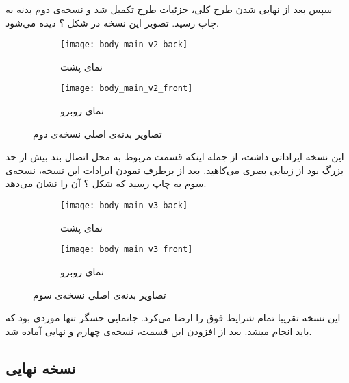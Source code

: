 سپس بعد از نهایی شدن طرح کلی، جزئیات طرح تکمیل شد و نسخه‌ی دوم بدنه به چاپ رسید. تصویر این نسخه در شکل ؟ دیده می‌شود.

\begin{figure}[h]
	\centering
	\begin{subfigure}{0.44\textwidth}
		\centering
		\texttt{[image: body\_main\_v2\_back]}
		\caption{نمای پشت}
	\end{subfigure}
	\begin{subfigure}{0.44\textwidth}
		\centering
		\texttt{[image: body\_main\_v2\_front]}
		\caption{نمای روبرو}
	\end{subfigure}
	\caption{تصاویر بدنه‌ی اصلی نسخه‌ی دوم}
	\label{fig:body-v2}
\end{figure}

این نسخه ایراداتی داشت، از جمله اینکه قسمت مربوط به محل اتصال بند بیش از حد بزرگ بود از زیبایی بصری می‌کاهید. بعد از برطرف نمودن ایرادات این نسخه، نسخه‌ی سوم به چاپ رسید که شکل ؟ آن را نشان می‌دهد.

\begin{figure}[h]
	\centering
	\begin{subfigure}{0.44\textwidth}
		\centering
		\texttt{[image: body\_main\_v3\_back]}
		\caption{نمای پشت}
	\end{subfigure}
	\begin{subfigure}{0.44\textwidth}
		\centering
		\texttt{[image: body\_main\_v3\_front]}
		\caption{نمای روبرو}
	\end{subfigure}
	\caption{تصاویر بدنه‌ی اصلی نسخه‌ی سوم}
	\label{fig:body-v3}
\end{figure}

این نسخه تقریبا تمام شرایط فوق را ارضا می‌کرد. جانمایی حسگر  تنها موردی بود که باید انجام میشد. بعد از افزودن این قسمت، نسخه‌ی چهارم و نهایی آماده شد.

\subsection{نسخه نهایی}


